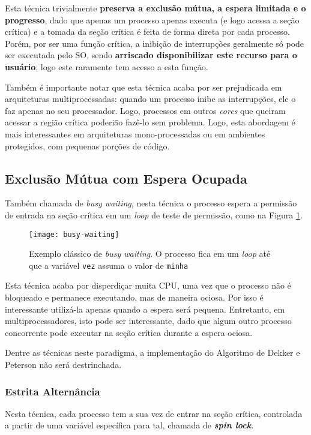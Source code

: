 Esta técnica trivialmente \textbf{preserva a exclusão mútua, a espera limitada e o progresso}, dado que apenas um processo apenas executa (e logo acessa a seção crítica) e a tomada da seção crítica é feita de forma direta por cada processo. Porém, por ser uma função crítica, a inibição de interrupções geralmente só pode ser executada pelo SO, sendo \textbf{arriscado disponibilizar este recurso para o usuário}, logo este raramente tem acesso a esta função.

Também é importante notar que esta técnica acaba por ser prejudicada em arquiteturas multiprocessadas: quando um processo inibe as interrupções, ele o faz apenas no seu processador. Logo, processos em outros \textit{cores} que queiram acessar a região crítica poderião fazê-lo sem problema. Logo, esta abordagem é mais interessantes em arquiteturas mono-processadas ou em ambientes protegidos, com pequenas porções de código.





\subsection{Exclusão Mútua com Espera Ocupada}
Também chamada de \textit{busy waiting}, nesta técnica o processo espera a permissão de entrada na seção crítica em um \textit{loop} de teste de permissão, como na Figura \ref{fig:busy-waiting}.

\begin{figure}[ht]
  \centering
  \texttt{[image: busy-waiting]}
  \caption{Exemplo clássico de \textit{busy waiting}. O processo fica em um \textit{loop} até que a variável \texttt{vez} assuma o valor de \texttt{minha}}
  \label{fig:busy-waiting}
\end{figure}

Esta técnica acaba por disperdiçar muita CPU, uma vez que o processo não é bloqueado e permanece executando, mas de maneira ociosa. Por isso é interessante utilizá-la apenas quando a espera será pequena. Entretanto, em multiprocessadores, isto pode ser interessante, dado que algum outro processo concorrente pode executar na seção crítica durante a espera ociosa.

Dentre as técnicas neste paradigma, a implementação do Algoritmo de Dekker e Peterson não será destrinchada.






\subsubsection{Estrita Alternância}
Nesta técnica, cada processo tem a sua vez de entrar na seção crítica, controlada a partir de uma variável específica para tal, chamada de \textbf{\textit{spin lock}}.


